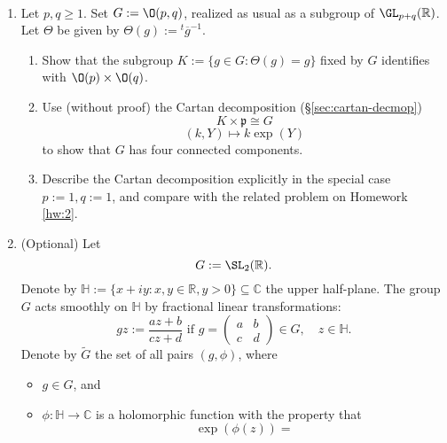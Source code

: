 \documentclass[reqno]{amsart} 
\begin{document}
\begin{homework}
~
  \begin{enumerate}
  \item
    Let $p,q \geq 1$.
    Set $G := \O(p,q)$,
    realized as usual as a subgroup of $\GL_{p+q}(\mathbb{R})$.
    Let $\Theta$ be given by $\Theta(g) := {}^t
    \overline{g}^{-1}$.
    \begin{enumerate}
    \item Show that the subgroup
      $K := \{g \in G : \Theta(g) = g\}$ fixed by $G$ identifies
      with $\O(p) \times \O(q)$.
    \item Use (without proof) the Cartan decomposition (\S\ref{sec:cartan-decmop})
      \begin{equation*}
K \times \mathfrak{p} \cong G
\end{equation*} 
\begin{equation*}
(k,Y) \mapsto k \exp(Y)
\end{equation*}
      to show that $G$ has four connected components.
    \item Describe the Cartan decomposition
      explicitly in the special case $p := 1, q := 1$,
      and compare with the related problem on Homework \ref{hw:2}.
    \end{enumerate}
  \item (Optional)
    Let 
\begin{equation*}
G := \SL_2(\mathbb{R}).
\end{equation*}
    Denote by $\mathbb{H} := \{x + i y : x,y \in \mathbb{R}, y >
    0\} \subseteq \mathbb{C}$ the upper half-plane.
    The group $G$ acts smoothly on $\mathbb{H}$ by fractional
    linear transformations:
    \begin{equation*}
      g z := \frac{a z + b}{c z + d}
      \text{ if }
      g = 
\begin{pmatrix}
        a & b \\
        c & d
      \end{pmatrix}
 \in G,
      \quad z \in \mathbb{H}.
    \end{equation*}
    Denote by $\tilde{G}$
    the set of all pairs
    $(g,\phi)$,
    where
    \begin{itemize}
    \item $g \in G$, and
    \item $\phi : \mathbb{H} \rightarrow \mathbb{C}$ is a
      holomorphic function
      with the property that
      \begin{equation*}
        \exp(\phi(z))
        =

\end{equation*}
\end{itemize}
\end{enumerate}
\end{homework}
\end{document}
